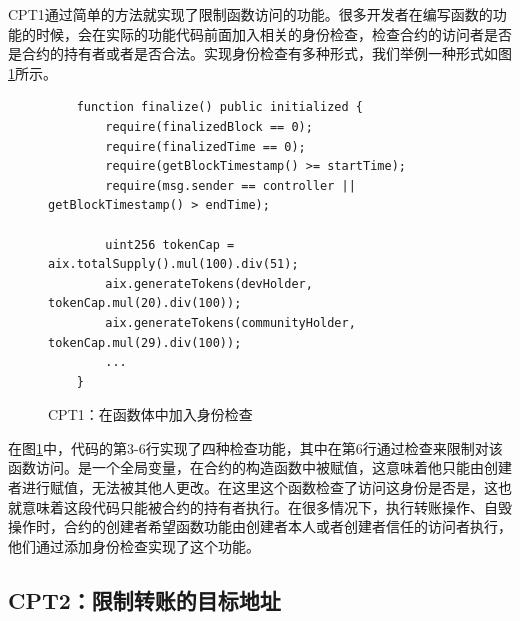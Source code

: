 CPT1通过简单的方法就实现了限制函数访问的功能。很多开发者在编写函数的功能的时候，会在实际的功能代码前面加入相关的身份检查，检查合约的访问者是否是合约的持有者或者是否合法。实现身份检查有多种形式，我们举例一种形式如图\ref{fig:ss1_example}所示。
\begin{figure}
\begin{minipage}[htbp]{1.0\linewidth}
    \begin{lstlisting}
    function finalize() public initialized {
        require(finalizedBlock == 0);
        require(finalizedTime == 0);
        require(getBlockTimestamp() >= startTime);
        require(msg.sender == controller || getBlockTimestamp() > endTime);

        uint256 tokenCap = aix.totalSupply().mul(100).div(51);
        aix.generateTokens(devHolder, tokenCap.mul(20).div(100));
        aix.generateTokens(communityHolder, tokenCap.mul(29).div(100));
        ...
    }
    \end{lstlisting}
\end{minipage}
\vspace{-5mm}
\caption{CPT1：在函数体中加入身份检查}
\label{fig:ss1_example}
\end{figure}
在图\ref{fig:ss1_example}中，代码的第3-6行实现了四种检查功能，其中在第6行通过检查来限制对该函数访问。是一个全局变量，在合约的构造函数中被赋值，这意味着他只能由创建者进行赋值，无法被其他人更改。在这里这个函数检查了访问这身份是否是，这也就意味着这段代码只能被合约的持有者执行。在很多情况下，执行转账操作、自毁操作时，合约的创建者希望函数功能由创建者本人或者创建者信任的访问者执行，他们通过添加身份检查实现了这个功能。
\subsection{CPT2：限制转账的目标地址}

